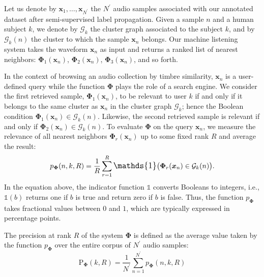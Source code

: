 \documentclass{bmcart}
\begin{document}
Let us denote by $\boldsymbol{x}_1, \ldots, \boldsymbol{x}_{{N}^{\prime}}$ the $N^{\prime}$ audio samples associated with our annotated dataset after semi-supervised label propagation.
Given a sample $n$ and a human subject $k$, we denote by $\mathcal{G}_k$ the cluster graph associated to the subject $k$, and by $\mathcal{G}_k (n)$ the cluster to which the sample $\boldsymbol{x}_{n}$ belongs.
Our machine listening system takes the waveform $\boldsymbol{x}_{n}$ as input and returns a ranked list of nearest neighbors: $\mathbf{\Phi}_1 (\boldsymbol{x}_n)$, $\mathbf{\Phi}_2 (\boldsymbol{x}_n)$, $\mathbf{\Phi}_3 (\boldsymbol{x}_n)$, and so forth.

In the context of browsing an audio collection by timbre similarity, $\boldsymbol{x}_n$ is a user-defined query while the function $\mathbf{\Phi}$ plays the role of a search engine.
We consider the first retrieved sample, $\mathbf{\Phi}_1 (\boldsymbol{x}_n)$, to be relevant to user $k$ if and only if it belongs to the same cluster as $\boldsymbol{x}_n$ in the cluster graph $\mathcal{G}_k$; hence the Boolean condition $\mathbf{\Phi}_{1}(\boldsymbol{x}_{n}) \in \mathcal{G}_k (n)$.
Likewise, the second retrieved sample is relevant if and only if $\mathbf{\Phi}_{2}(\boldsymbol{x}_{n}) \in \mathcal{G}_k (n)$.
To evaluate $\mathbf{\Phi}$ on the query $\boldsymbol{x}_n$, we measure the relevance of all nearest neighbors $\mathbf{\Phi}_r (\boldsymbol{x}_n)$ up to some fixed rank $R$ and average the result:
\begin{equation}
p_{\mathbf{\Phi}}(n, k, R) =
    \dfrac{1}{R}
    \sum_{r=1}^{R}
    \mathlarger{\mathds{1}}
    \big(
        \mathbf{\Phi}_r(\boldsymbol{x}_n)
        \in
        \mathcal{G}_k (n)
    \big).
\end{equation}
In the equation above, the indicator function $\mathds{1}$ converts Booleans to integers, i.e., $\mathds{1}(b)$ returns one if $b$ is true and return zero if $b$ is false.
Thus, the function $p_{\mathbf{\Phi}}$ takes fractional values between $0$ and $1$, which are typically expressed in percentage points.

The precision at rank $R$ of the system $\mathbf{\Phi}$ is defined as the average value taken by the function $p_{\mathbf{\Phi}}$ over the entire corpus of $N^{\prime}$ audio samples:
\begin{equation}
\mathrm{P}_{\mathbf{\Phi}}(k, R) =
\dfrac{1}{N^{\prime}}
\sum_{n=1}^{N^{\prime}}
p_{\mathbf{\Phi}}(n, k, R)
\end{equation}
\end{document}
